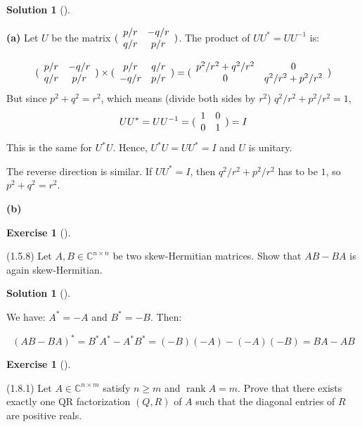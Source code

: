 \documentclass[numbers=enddot,12pt,final,onecolumn,notitlepage]{scrartcl}
\newcounter{exer}
\newcounter{sol}
\theoremstyle{definition}
\newtheorem{exmp}[exer]{Exercise}
\newenvironment{exercise}[1][]
{\begin{exmp}[#1]\begin{leftbar}}
        {\end{leftbar}\end{exmp}}
\newtheorem{solu}[sol]{Solution}
\newenvironment{solution}[1][]
{\begin{solu}[#1]\begin{leftbar}}
        {\end{leftbar}\end{solu}}
\begin{document}
\begin{solution}
	\textbf{(a)}
	Let $U$ be the matrix
	$(\begin{array}
			[c]{cc}%
			p/r & -q/r \\
			q/r & p/r
		\end{array})$. The product of $UU^{\ast} = UU^{-1}$ is:

	\[
		(\begin{array}
			[c]{cc}%
			p/r & -q/r \\
			q/r & p/r
		\end{array}) \times
		(\begin{array}
				[c]{cc}%
				p/r  & q/r \\
				-q/r & p/r
			\end{array}) =
		(\begin{array}
			[c]{cc}%
			p^2/r^2 + q^2/r^2 & 0                 \\
			0                 & q^2/r^2 + p^2/r^2
		\end{array})
	\]
	But since $p^2 + q^2 = r^2$, which means (divide both sides by $r^2$) $q^2/r^2 + p^2/r^2 = 1$,
	\[
		UU^{\ast} = UU^{-1} =
		(\begin{array}
			[c]{cc}%
			1 & 0 \\
			0 & 1
		\end{array}) = I
	\]
	This is the same for $U^{\ast}U$. Hence, $U^{\ast}U = UU^{\ast} = I$ and $U$ is unitary.

	The reverse direction is similar. If $UU^{\ast} = I$, then $q^2/r^2 + p^2/r^2$ has to be $1$, so $p^2 + q^2 = r^2$.

	\textbf{(b)}

\end{solution}

\begin{exercise}
	 (1.5.8) Let $A,B\in\mathbb{C}^{n\times n}$ be two skew-Hermitian matrices.
	Show that $AB-BA$ is again skew-Hermitian.
\end{exercise}

\begin{solution}
	We have: $A^{\ast} = -A$ and $B^{\ast} = -B$. Then:

	\[
		(AB - BA)^{\ast} = B^{\ast}A^{\ast} - A^{\ast}B^{\ast} = (-B)(-A) - (-A)(-B) = BA - AB
	\]
\end{solution}

\begin{exercise}
	\label{exe.unitary.QR2-uni} (1.8.1) Let $A\in\mathbb{C}^{n\times m}$ satisfy
	$n\geq m$ and $\operatorname*{rank}A=m$. Prove that there exists exactly one
	QR factorization $\left(  Q,R\right)  $ of $A$ such that the diagonal entries
	of $R$ are positive reals.
\end{exercise}
\end{document}
